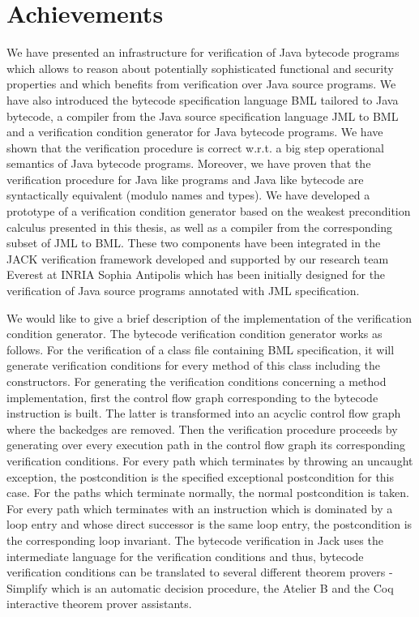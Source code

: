 
\section{Achievements}
We have  presented an infrastructure for verification of Java bytecode programs   which allows to reason about potentially
sophisticated  functional and security properties and
which benefits from verification over Java source programs. We have also 
introduced the bytecode specification language BML tailored to Java bytecode, a compiler
from the Java source specification language JML to BML and a verification 
condition generator for Java bytecode programs. 
We have shown that the verification procedure is correct w.r.t. a big step  operational semantics of Java bytecode programs. 
Moreover, we have
proven that the verification procedure for Java like programs
and Java like bytecode are syntactically equivalent (modulo names and types). 
We have developed a prototype of a verification condition generator based on the weakest precondition calculus presented in this thesis, as well 
as a compiler from the corresponding subset of JML to BML.
These two components have been integrated in the JACK \cite{BRL-JACK} verification framework 
developed and supported by our research team Everest at INRIA Sophia Antipolis which has been initially designed for
 the verification of Java source programs annotated with JML specification.

We would like to give a brief description of the implementation of the verification condition generator.
The bytecode verification condition generator works as follows. For the verification of a class file containing BML specification, it will generate verification conditions for every
 method of this class including the constructors. For generating the verification conditions concerning a method implementation, first the control flow
 graph corresponding to the bytecode instruction is built. The latter is transformed into an acyclic control flow graph where the backedges are 
removed.
 Then the verification procedure proceeds by generating over every execution path in the control flow graph its corresponding verification conditions. 
For every path which terminates by throwing an uncaught exception, the postcondition is the specified exceptional postcondition for this case. For the paths which terminate normally, 
the normal postcondition is taken. For every path which terminates with an instruction which is dominated by a loop entry and whose direct successor is the same loop entry, the postcondition 
is the corresponding loop invariant. The bytecode verification in Jack uses the intermediate language for the verification conditions and thus, bytecode verification conditions 
 can be translated to several different theorem provers - Simplify \cite{Simpl05DNS} which is an automatic decision procedure, 
the Atelier B and the Coq interactive theorem prover assistants. 

